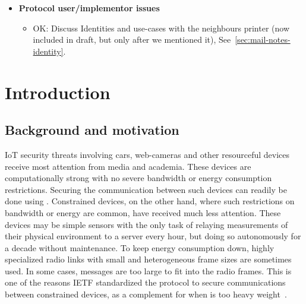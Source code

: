 \documentclass[runningheads,draft,x11names]{llncs}
\begin{document}
{\begin{itemize}
\begin{itemize}
\begin{itemize}
                confirmation and hence explicit inj-agree also for $I$.
                \item Discuss Transcipt hashes that lag behind one message and that
                it is supposed to "cover as much as possible", but sometimes
                does not (check tamarin model also for inconsistencies between
                methods). Unclear design except "as much as possible".
                \end{itemize}
            \item{\textbf{Protocol user/implementor issues}}
                \begin{itemize}
                \item OK: Discuss Identities and use-cases with the neighbours printer
                (now included in draft, but only after we mentioned it),
                See~\ref{sec:mail-notes-identity}.
                \end{itemize}
        \end{itemize}
\end{itemize}
}
\fi %

\section{Introduction}
\label{sec:introduction}
\subsection{Background and motivation}
\label{sec:motivation}
IoT security threats involving cars, web-cameras and other resourceful devices
receive most attention from media and academia.
%
These devices are computationally strong with no severe bandwidth or energy
consumption restrictions.
%
Securing the communication between such devices can readily be done using
\mDandTls.
%
Constrained devices, on the other hand, where such restrictions on bandwidth or
energy are common, have received much less attention.
%
These devices may be simple sensors with the only task of relaying
measurements of their physical environment to a server every hour, but doing so
autonomously for a decade without maintenance.
%
To keep energy consumption down, highly specialized radio links with small
and heterogeneous frame sizes are sometimes used.
%
In some cases, \mDandTls{} messages are too large to fit into the radio frames.
%
This is one of the reasons IETF standardized the \mOscore{} protocol to secure
communications between constrained devices, as a complement for when
\mDandTls{} is too heavy weight~\cite{rfc8613}.
%
\end{document}
